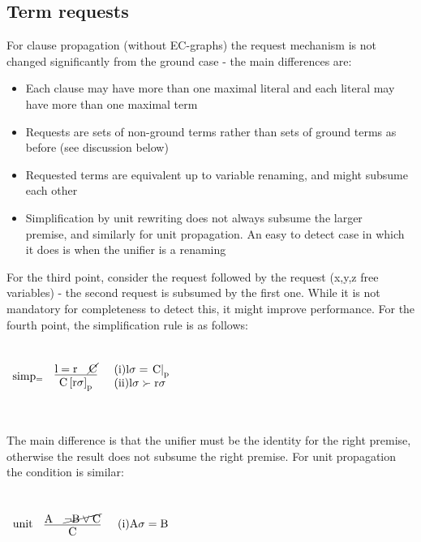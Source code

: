 \subsection*{Term requests}
For clause propagation (without EC-graphs) the request mechanism is not \\
changed significantly from the ground case - the main differences are:
\begin{itemize}
	\item Each clause may have more than one maximal literal and each literal may have more than one maximal term
	\item Requests are sets of non-ground terms rather than sets of ground terms as before (see discussion below)
	\item Requested terms are equivalent up to variable renaming, and might subsume each other
	\item Simplification by unit rewriting does not always subsume the larger \\premise, and similarly for unit propagation. 
	An easy to detect case in which it does is when the unifier is a renaming
\end{itemize}

For the third point, consider the request  followed by the request  (x,y,z free variables) - the second request is subsumed by the first one. While it is not mandatory for completeness to detect this, it might improve performance. For the fourth point, the simplification rule is as follows:

\medskip

\noindent
$
\begin{array}{lll}
\vspace{10pt}
\mathrm{simp_{=}} &\vcenter{\infer[]{\m{\termRepAt{C}{r\sigma}{p}}}{\m{l=r} & \cancel{\m{C}}}} & 
\parbox[c][2cm]{5cm}{
	\m{\sci{1}l\sigma=\termAt{C}{p}}\\
	\m{\sci{2}l\sigma \succ r\sigma}}\\
\end{array}
$

The main difference is that the unifier must be the identity for the right premise, otherwise the result does not subsume the right premise. For unit propagation the condition is similar:

\medskip

\noindent
$
\begin{array}{lll}
\vspace{10pt}
\mathrm{unit} &\vcenter{\infer[]{\m{C}}{\m{A} & \cancel{\m{\lnot B \lor C}}}} & 
\parbox[c][2cm]{5cm}{
	\m{\sci{1}A\sigma=B}}
\end{array}
$

